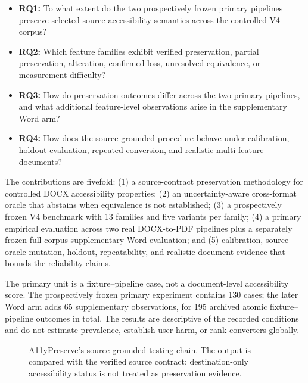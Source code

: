 \begin{itemize}
\item \textbf{RQ1:} To what extent do the two prospectively frozen primary pipelines preserve selected source accessibility semantics across the controlled V4 corpus?
\item \textbf{RQ2:} Which feature families exhibit verified preservation, partial preservation, alteration, confirmed loss, unresolved equivalence, or measurement difficulty?
\item \textbf{RQ3:} How do preservation outcomes differ across the two primary pipelines, and what additional feature-level observations arise in the supplementary Word arm?
\item \textbf{RQ4:} How does the source-grounded procedure behave under calibration, holdout evaluation, repeated conversion, and realistic multi-feature documents?
\end{itemize}

The contributions are fivefold: (1) a source-contract preservation methodology for controlled DOCX accessibility properties; (2) an uncertainty-aware cross-format oracle that abstains when equivalence is not established; (3) a prospectively frozen V4 benchmark with 13 families and five variants per family; (4) a primary empirical evaluation across two real DOCX-to-PDF pipelines plus a separately frozen full-corpus supplementary Word evaluation; and (5) calibration, source-oracle mutation, holdout, repeatability, and realistic-document evidence that bounds the reliability claims.

The primary unit is a fixture--pipeline case, not a document-level accessibility score. The prospectively frozen primary experiment contains 130 cases; the later Word arm adds 65 supplementary observations, for 195 archived atomic fixture--pipeline outcomes in total. The results are descriptive of the recorded conditions and do not estimate prevalence, establish user harm, or rank converters globally.

\begin{figure}[t]
\centering
{}
\caption{A11yPreserve's source-grounded testing chain. The output is compared with the verified source contract; destination-only accessibility status is not treated as preservation evidence.}
\label{fig:workflow}
\end{figure}
